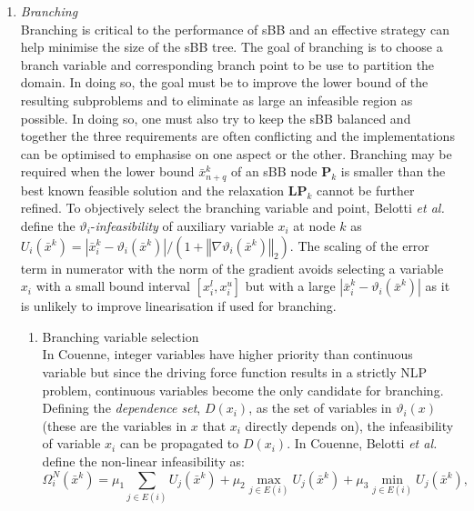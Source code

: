 \begin{enumerate}
	\item \emph{Branching}\\
		Branching is critical to the performance of sBB and an effective strategy can help minimise the size of the sBB tree. The goal of branching is to choose a branch variable and corresponding branch point to be use to partition the domain. In doing so, the goal must be to improve the lower bound of the resulting subproblems and to eliminate as large an infeasible region as possible. In doing so, one must also try to keep the sBB balanced and together the three requirements are often conflicting and the implementations can be optimised to emphasise on one aspect or the other. Branching may be required when the lower bound $\bar{x}_{n+q}^k$ of an sBB node $\mathbf{P}_k$ is smaller than the best known feasible solution and the relaxation $\mathbf{LP}_k$ cannot be further refined. To objectively select the branching variable and point, Belotti \textit{et al.} \cite{Belotti:2009aa} define the $\vartheta_i$-\textit{infeasibility} of auxiliary variable $x_i$ at node $k$ as $U_i\left(\bar{x}^k\right) = \left|\bar{x}_i^k - \vartheta_i\left(\bar{x}^k\right) \right| \slash \left(1 + \left \Vert \nabla \vartheta_i(\bar{x}^k)  \right \Vert_2\right)$. The scaling of the error term in numerator with the norm of the gradient avoids selecting a variable $x_i$ with a small bound interval $[x_i^l, x_i^u]$ but with a large $\left|\bar{x}_i^k - \vartheta_i\left(\bar{x}^k\right) \right|$ as it is unlikely to improve linearisation if used for branching.
		\begin{enumerate}
			\item	Branching variable selection\\
				In Couenne, integer variables have higher priority than continuous variable but since the driving force function results in a strictly NLP problem, continuous variables become the only candidate for branching. Defining the \emph{dependence set}, $D(x_i)$, as the set of variables in $\vartheta_i(x)$ (these are the variables in $x$ that $x_i$ directly depends on), the infeasibility of variable $x_i$ can be propagated to $D(x_i)$. In Couenne, Belotti \textit{et al.} \cite{Belotti:2009aa} define the non-linear infeasibility as:
				\[
					\Omega_i^N(\bar{x}^k) = \mu_1 \sum_{j\in E(i)} U_j(\bar{x}^k) +  \mu_2 \max_{j\in E(i)} U_j(\bar{x}^k) +  \mu_3 \min_{j\in E(i)} U_j(\bar{x}^k),
				\]

\end{enumerate}
\end{enumerate}
